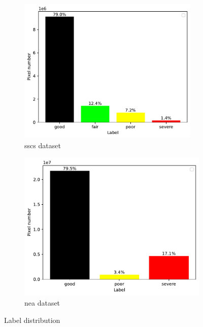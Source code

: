 \documentclass[mathematics,article,submit,pdftex,moreauthors]{Definitions/mdpi}
\begin{document}
\begin{figure}[!ht]
  \centering
  \begin{subfigure}[t]{.48\textwidth}
    \centering
    \includegraphics[width=0.95\textwidth]{figures/CCSCclass_distribution.pdf}
    \caption{\ac{sscs} dataset}
    \label{fig:label-distribution:ccsc}
  \end{subfigure}
  \begin{subfigure}[t]{.49\textwidth}
    \centering
    \includegraphics[width=.95\linewidth]{figures/NEAclass_distribution.pdf}
    \caption{\ac{nea} dataset}
    \label{fig:label-distribution:nea}
  \end{subfigure}
  \caption{Label distribution}
  \label{fig:label-distribution}
\end{figure}
\end{document}
